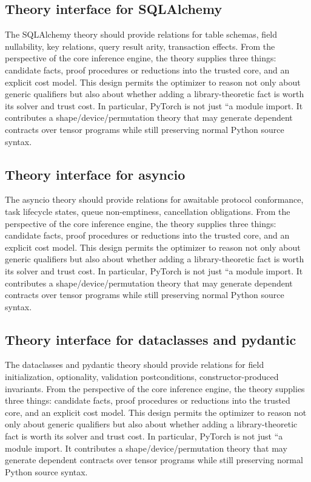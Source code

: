 \documentclass[11pt]{article}
\theoremstyle{definition}
\theoremstyle{plain}
\begin{document}
\subsection{Theory interface for SQLAlchemy}
The SQLAlchemy theory should provide relations for table schemas, field nullability, key relations, query result arity, transaction effects. From the perspective of
the core inference engine, the theory supplies three things: candidate facts,
proof procedures or reductions into the trusted core, and an explicit cost model.
This design permits the optimizer to reason not only about generic qualifiers but
also about whether adding a library-theoretic fact is worth its solver and trust
cost. In particular, PyTorch is not just ``a module import. It contributes a
shape/device/permutation theory that may generate dependent contracts over tensor
programs while still preserving normal Python source syntax.

\subsection{Theory interface for asyncio}
The asyncio theory should provide relations for awaitable protocol conformance, task lifecycle states, queue non-emptiness, cancellation obligations. From the perspective of
the core inference engine, the theory supplies three things: candidate facts,
proof procedures or reductions into the trusted core, and an explicit cost model.
This design permits the optimizer to reason not only about generic qualifiers but
also about whether adding a library-theoretic fact is worth its solver and trust
cost. In particular, PyTorch is not just ``a module import. It contributes a
shape/device/permutation theory that may generate dependent contracts over tensor
programs while still preserving normal Python source syntax.

\subsection{Theory interface for dataclasses and pydantic}
The dataclasses and pydantic theory should provide relations for field initialization, optionality, validation postconditions, constructor-produced invariants. From the perspective of
the core inference engine, the theory supplies three things: candidate facts,
proof procedures or reductions into the trusted core, and an explicit cost model.
This design permits the optimizer to reason not only about generic qualifiers but
also about whether adding a library-theoretic fact is worth its solver and trust
cost. In particular, PyTorch is not just ``a module import. It contributes a
shape/device/permutation theory that may generate dependent contracts over tensor
programs while still preserving normal Python source syntax.
\end{document}
